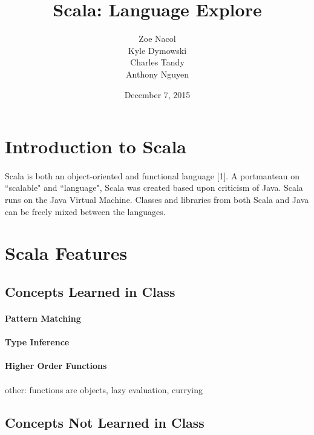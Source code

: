 \documentclass[12pt]{article}
\begin{document}
\title{Scala: Language Explore}
\date{December 7, 2015}
\author{Zoe Nacol \\ Kyle Dymowski \\ Charles Tandy \\ Anthony Nguyen}
\maketitle

\section{Introduction to Scala}
	\paragraph{}Scala is both an object-oriented and functional language [1]. A portmanteau on ``scalable" and ``language", Scala was created based upon criticism of Java. Scala runs on the Java Virtual Machine. Classes and libraries from both Scala and Java can be freely mixed between the languages.
\section{Scala Features}
	\subsection{Concepts Learned in Class}
	\paragraph{Pattern Matching}
	\paragraph{Type Inference}
	\paragraph{Higher Order Functions}
	\paragraph{} other: functions are objects, lazy evaluation, currying
	\subsection{Concepts Not Learned in Class}
\end{document}
